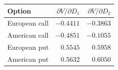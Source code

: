 \begin{tabular}{lrr}
\toprule
Option & $\partial V/\partial D_1$ & $\partial V/\partial D_2$ \\
\midrule
European call & $-0.4411$ & $-0.3863$ \\
American call & $-0.4851$ & $-0.1055$ \\
European put & $0.5545$ & $0.5958$ \\
American put & $0.5632$ & $0.6050$ \\
\bottomrule
\end{tabular}

